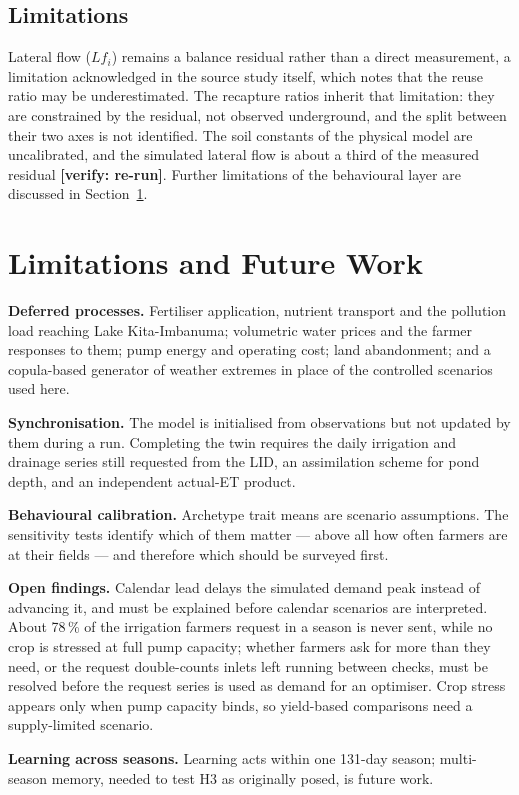 \documentclass{article}
\newcommand{\verify}[1]{{\color{orange!85!black}\textbf{[verify: #1]}}}
\begin{document}
\subsection{Limitations}
\begin{changed}
Lateral flow ($Lf_i$) remains a balance residual rather than a direct measurement, a limitation acknowledged in the source study itself, which notes that the reuse ratio may be underestimated. The recapture ratios inherit that limitation: they are constrained by the residual, not observed underground, and the split between their two axes is not identified. The soil constants of the physical model are uncalibrated, and the simulated lateral flow is about a third of the measured residual \verify{re-run}. Further limitations of the behavioural layer are discussed in Section~\ref{sec:limitations}.
\end{changed}

\section{Limitations and Future Work}
\label{sec:limitations}
\begin{added}
\textbf{Deferred processes.} Fertiliser application, nutrient transport and the pollution load reaching Lake Kita-Imbanuma; volumetric water prices and the farmer responses to them; pump energy and operating cost; land abandonment; and a copula-based generator of weather extremes \cite{Claassen2025} in place of the controlled scenarios used here.

\textbf{Synchronisation.} The model is initialised from observations but not updated by them during a run. Completing the twin requires the daily irrigation and drainage series still requested from the LID, an assimilation scheme for pond depth, and an independent actual-ET product.

\textbf{Behavioural calibration.} Archetype trait means are scenario assumptions. The sensitivity tests identify which of them matter --- above all how often farmers are at their fields --- and therefore which should be surveyed first.

\textbf{Open findings.} Calendar lead delays the simulated demand peak instead of advancing it, and must be explained before calendar scenarios are interpreted. About 78\,\% of the irrigation farmers request in a season is never sent, while no crop is stressed at full pump capacity; whether farmers ask for more than they need, or the request double-counts inlets left running between checks, must be resolved before the request series is used as demand for an optimiser. Crop stress appears only when pump capacity binds, so yield-based comparisons need a supply-limited scenario.

\textbf{Learning across seasons.} Learning acts within one 131-day season; multi-season memory, needed to test H3 as originally posed, is future work.
\end{added}
\end{document}
